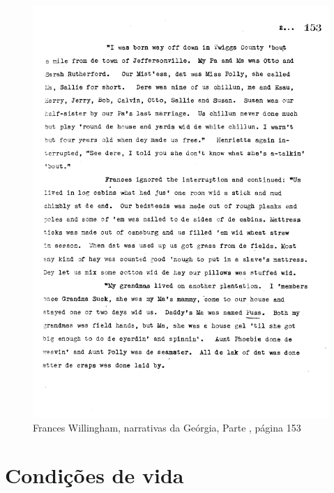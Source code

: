 \movetoevenpage
\thispagestyle{empty}
\begin{absolutelynopagebreak}
\begin{vplace}
\begin{figure}[H]
\begin{adjustwidth}{-1.8cm}{}
  \vspace*{-2cm}
  \includegraphics[width=130mm]{./imgs/Cap2.jpg}  
\end{adjustwidth}
  \caption{Frances Willingham, narrativas da Geórgia, Parte , página 153}
\end{figure}
\end{vplace}

\end{absolutelynopagebreak}

\chapter{Condições de vida}

